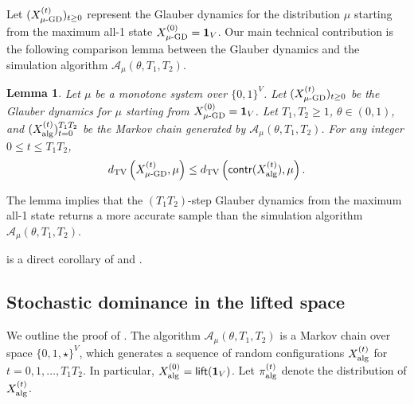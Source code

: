 \documentclass[11pt,a4paper]{article}
\newcommand{\DTV}[2]{d_{\mathrm{TV}}\left({#1},{#2}\right)}
\newtheorem{lemma}[theorem]{Lemma}
\theoremstyle{definition}
\def\*#1{\mathbf{#1}} %
\def\+#1{\mathcal{#1}} %
\begin{document}
Let \( (X^{(t)}_{\textnormal{$\mu$-GD}} )_{t \geq 0} \) represent the Glauber dynamics for the distribution \( \mu \) starting from the maximum all-1 state \( X^{(0)}_{\textnormal{$\mu$-GD}} = \*1_V \). 
Our main technical contribution is the following comparison lemma between the Glauber dynamics and the simulation algorithm $\+A_{\mu}(\theta,T_1,T_2)$.

\begin{lemma} \label{lem:comparison}
Let $\mu$ be a monotone system over $\{0,1\}^V$.
Let \( (X^{(t)}_{\textnormal{$\mu$-GD}} )_{t \geq 0} \) be the Glauber dynamics for $\mu$ starting from $X^{(0)}_{\textnormal{$\mu$-GD}} = \*1_V$.
Let $T_1,T_2 \geq 1$, $\theta \in (0,1)$, and $(X^{(t)}_{\textnormal{alg}})_{t=0}^{T_1T_2}$ be the Markov chain generated by $\+A_{\mu}(\theta,T_1,T_2)$.
For any integer $0 \leq t \leq T_1T_2$, 
\begin{align}\label{eq:comparison-dtv}
    \DTV{X^{(t)}_{\textnormal{$\mu$-GD}}}{\mu} \leq \DTV{\textnormal{\textsf{contr}}(X^{(t)}_{\textnormal{alg}})}{\mu}.
\end{align}
\end{lemma}

The lemma implies that the $(T_1T_2)$-step Glauber dynamics from the maximum all-1 state returns a more accurate sample than the simulation algorithm $\+A_{\mu}(\theta,T_1,T_2)$. 

 is a direct corollary of  and .


\subsection{Stochastic dominance in the lifted space}
We outline the proof of . The algorithm $\+A_{\mu}(\theta,T_1,T_2)$ is a Markov chain over space $\{0,1,\star\}^V$, which generates a sequence of random configurations $X^{(t)}_{\textnormal{alg}}$ for $t=0,1,\ldots,T_1T_2$. In particular, $X^{(0)}_{\textnormal{alg}}=\textsf{lift}(\*1_V)$.
Let $\pi^{(t)}_{\textnormal{alg}}$ denote the distribution of $X^{(t)}_{\textnormal{alg}}$. 
\end{document}

